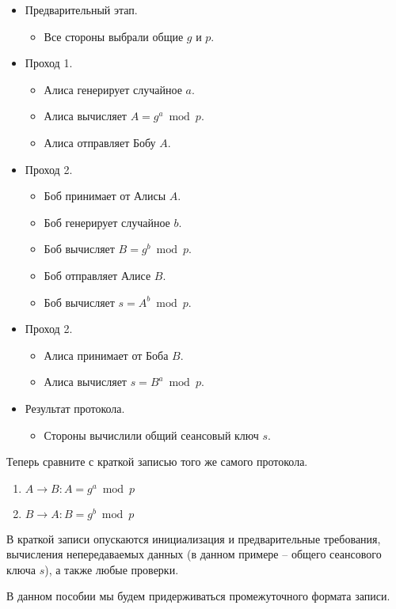\begin{itemize}
	\item Предварительный этап.
	\begin{itemize}
		\item Все стороны выбрали общие $g$ и $p$.
	\end{itemize}
	\item Проход 1.
	\begin{itemize}
		\item Алиса генерирует случайное $a$.
		\item Алиса вычисляет $A = g^a \bmod p$.
		\item Алиса отправляет Бобу $A$.
	\end{itemize}
	\item Проход 2.
	\begin{itemize}
		\item Боб принимает от Алисы $A$.
		\item Боб генерирует случайное $b$.
		\item Боб вычисляет $B = g^b \bmod p$.
		\item Боб отправляет Алисе $B$.
		\item Боб вычисляет $s = A^b \bmod p$.
	\end{itemize}
	\item Проход 2.
	\begin{itemize}
		\item Алиса принимает от Боба $B$.
		\item Алиса вычисляет $s = B^a \bmod p$.
	\end{itemize}
	\item Результат протокола.
	\begin{itemize}
		\item Стороны вычислили общий сеансовый ключ $s$.
	\end{itemize}
\end{itemize}

Теперь сравните с краткой записью того же самого протокола.
\begin{enumerate}
	\item $A \to B : A = g^a \bmod p$
	\item $B \to A : B = g^b \bmod p$
\end{enumerate}

В краткой записи опускаются инициализация и предварительные требования, вычисления непередаваемых данных (в данном примере -- общего сеансового ключа $s$), а также любые проверки.

В данном пособии мы будем придерживаться промежуточного формата записи.

